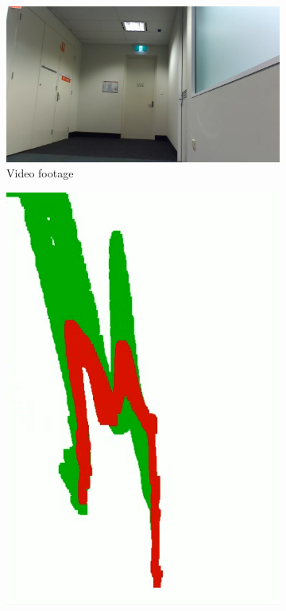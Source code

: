 \begin{figure}[p]
    \centering
    \begin{subfigure}{.55\textwidth}
        \centering
        \includegraphics[width=\linewidth]{images/pcloud_indoor_comparison.PNG}
        \caption{Video footage}
    \end{subfigure}
    \begin{subfigure}{.2\textwidth}
        \centering
        \includegraphics[width=\linewidth,frame]{images/pcloud_indoor_performance.PNG}

\end{subfigure}
\end{figure}
